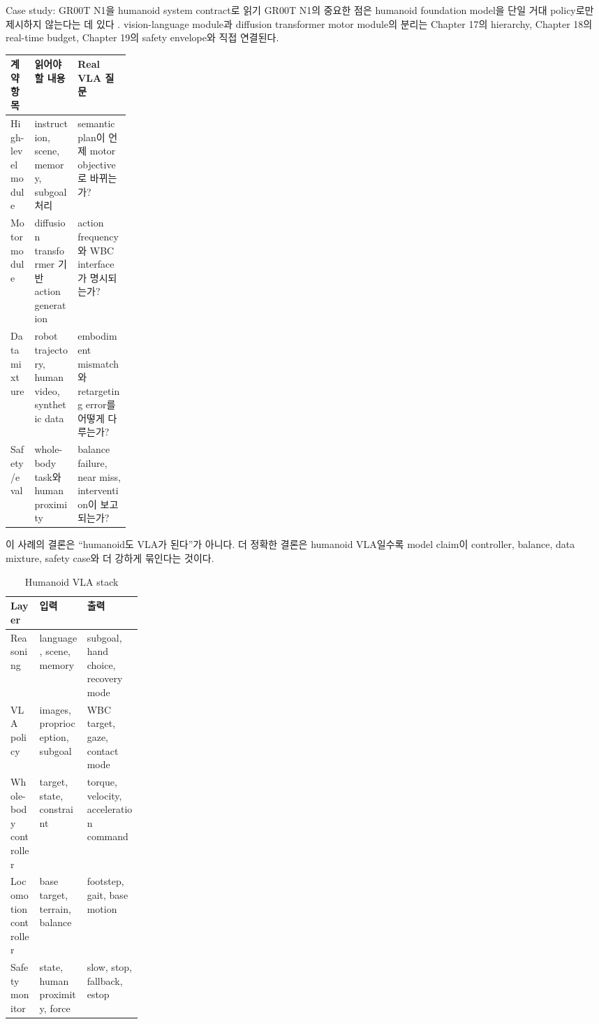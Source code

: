 \begin{casebox}{Case study: GR00T N1을 humanoid system contract로 읽기}
GR00T N1의 중요한 점은 humanoid foundation model을 단일 거대 policy로만 제시하지 않는다는 데 있다 \cite{grootn12025}. vision-language module과 diffusion transformer motor module의 분리는 Chapter 17의 hierarchy, Chapter 18의 real-time budget, Chapter 19의 safety envelope와 직접 연결된다.

\begin{center}
\small
\begin{tabularx}{\linewidth}{@{}p{0.2\linewidth}X X@{}}
\toprule
계약 항목 & 읽어야 할 내용 & Real VLA 질문 \\
\midrule
High-level module & instruction, scene, memory, subgoal 처리 & semantic plan이 언제 motor objective로 바뀌는가? \\
Motor module & diffusion transformer 기반 action generation & action frequency와 WBC interface가 명시되는가? \\
Data mixture & robot trajectory, human video, synthetic data & embodiment mismatch와 retargeting error를 어떻게 다루는가? \\
Safety/eval & whole-body task와 human proximity & balance failure, near miss, intervention이 보고되는가? \\
\bottomrule
\end{tabularx}
\end{center}

이 사례의 결론은 ``humanoid도 VLA가 된다''가 아니다. 더 정확한 결론은 humanoid VLA일수록 model claim이 controller, balance, data mixture, safety case와 더 강하게 묶인다는 것이다.
\end{casebox}

\begin{table}[h]
  \centering
  \caption{Humanoid VLA stack}
  \begin{tabularx}{\linewidth}{p{0.22\linewidth}X X}
    \toprule
    Layer & 입력 & 출력 \\
    \midrule
    Reasoning & language, scene, memory & subgoal, hand choice, recovery mode \\
    VLA policy & images, proprioception, subgoal & WBC target, gaze, contact mode \\
    Whole-body controller & target, state, constraint & torque, velocity, acceleration command \\
    Locomotion controller & base target, terrain, balance & footstep, gait, base motion \\
    Safety monitor & state, human proximity, force & slow, stop, fallback, estop \\
    \bottomrule
  \end{tabularx}
  \label{tab:ch20-stack}
\end{table}


